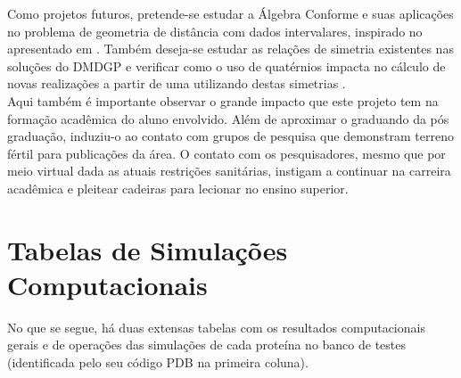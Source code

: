 \documentclass[a4paper,12pt]{report}
\theoremstyle{plain}
\theoremstyle{definition}
\begin{document}
	Como projetos futuros, pretende-se estudar a Álgebra Conforme e suas aplicações no problema de geometria de distância com dados intervalares, inspirado no apresentado em \cite{michaelOrthogonality}. Também deseja-se estudar as relações de simetria existentes nas soluções do DMDGP e verificar como o uso de quatérnios impacta no cálculo de novas realizações a partir de uma utilizando destas simetrias \cite{fidalgotese,carlileGDandAplications}.
	\\
	
	Aqui também é importante observar o grande impacto que este projeto tem na formação acadêmica do aluno envolvido. Além de aproximar o graduando da pós graduação, induziu-o ao contato com grupos de pesquisa que demonstram terreno fértil para publicações da área. O contato com os pesquisadores, mesmo que por meio virtual dada as atuais restrições sanitárias, instigam a continuar na carreira acadêmica e pleitear cadeiras para lecionar no ensino superior.
	
	
	
	
	
	
	\newpage
	\appendix
		
	
	
	
	\chapter{Tabelas de Simulações Computacionais\label{ap:tabelas}}
	No que se segue, há duas extensas tabelas com os resultados computacionais gerais e de operações das simulações de cada proteína no banco de testes (identificada pelo seu código PDB na primeira coluna).
	
	\begin{footnotesize}
		
		\newpage
	\end{footnotesize}
	
\end{document}
